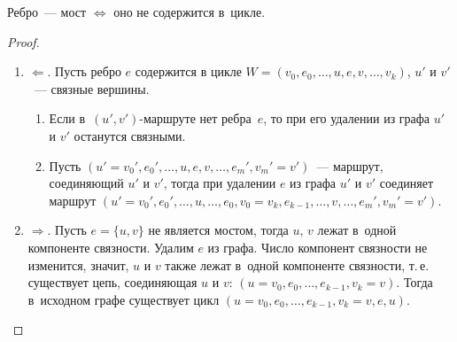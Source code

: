\begin{statement}
\label{st:criterion_of_bridge_in_graph}
Ребро~--- мост $\Leftrightarrow$ оно не содержится в~цикле.
\end{statement}
\begin{proof}
\begin{enumerate}
	\item $\Leftarrow$.
	Пусть ребро $e$ содержится в цикле $W = (v_0, e_0, \ldots, u, e, v, \ldots, v_k)$, $u'$ и $v'$~--- связные вершины.
	\begin{enumerate}
		\item Если в~$(u', v')$-маршруте нет ребра~$e$, то при его удалении из графа $u'$ и $v'$ останутся связными.
		\item Пусть $(u' = v_0', e_0', \ldots, u, e, v, \ldots, e_m', v_m' = v')$~--- маршрут, соединяющий $u'$ и $v'$, тогда при удалении $e$ из графа $u'$ и $v'$ соединяет маршрут
		$(u' = v_0', e_0', \ldots, u, \ldots, e_0, v_0 = v_k, e_{k-1}, \ldots, v, \ldots, e_m', v_m' = v')$.
	\end{enumerate}
	
	\item $\Rightarrow$.
	Пусть $e = \{ u, v \}$ не является мостом, тогда $u$, $v$ лежат в~одной компоненте связности.
	Удалим $e$ из графа.
	Число компонент связности не изменится, значит, $u$ и $v$ также лежат в~одной компоненте связности, т.\,е. существует цепь, соединяющая $u$ и $v$: $(u = v_0, e_0, \ldots, e_{k-1}, v_k = v)$.
	Тогда в~исходном графе существует цикл $(u = v_0, e_0, \ldots, e_{k-1}, v_k = v, e, u)$.
\end{enumerate}
\end{proof}

